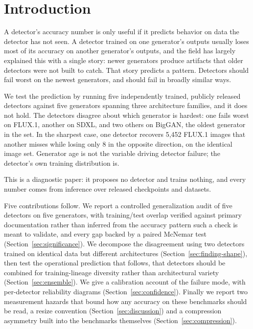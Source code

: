 \documentclass[3p,times,procedia]{elsarticle}
\begin{document}

\vspace*{-6pt}

\section{Introduction}
\label{sec:intro}

A detector's accuracy number is only useful if it predicts behavior on
data the detector has not seen. A detector trained on one generator's
outputs usually loses most of its accuracy on another generator's outputs,
and the field has largely explained this with a single story: newer
generators produce artifacts that older detectors were not built to catch.
That story predicts a pattern. Detectors should fail worst on the newest
generators, and should fail in broadly similar ways.

We test the prediction by running five independently trained, publicly
released detectors against five generators spanning three architecture
families, and it does not hold. The detectors disagree about which
generator is hardest: one fails worst on FLUX.1, another on SDXL, and two
others on BigGAN, the oldest generator in the set. In the sharpest case,
one detector recovers 5{,}452 FLUX.1 images that another misses while
losing only 8 in the opposite direction, on the identical image set.
Generator age is not the variable driving detector failure; the detector's
own training distribution is.

This is a diagnostic paper: it proposes no detector and trains nothing,
and every number comes from inference over released checkpoints and
datasets.

Five contributions follow. We report a controlled generalization audit of
five detectors on five generators, with training/test overlap verified
against primary documentation rather than inferred from the accuracy
pattern such a check is meant to validate, and every gap backed by a
paired McNemar test (Section~\ref{sec:significance}). We decompose the
disagreement using two detectors trained on identical data but different
architectures (Section~\ref{sec:finding-shape}), then test the
operational prediction that follows, that detectors should be combined for
training-lineage diversity rather than architectural variety
(Section~\ref{sec:ensemble}). We give a calibration account of the failure
mode, with per-detector reliability diagrams
(Section~\ref{sec:confidence}). Finally we report two measurement hazards
that bound how any accuracy on these benchmarks should be read, a resize
convention (Section~\ref{sec:discussion}) and a compression asymmetry
built into the benchmarks themselves (Section~\ref{sec:compression}).
\end{document}
